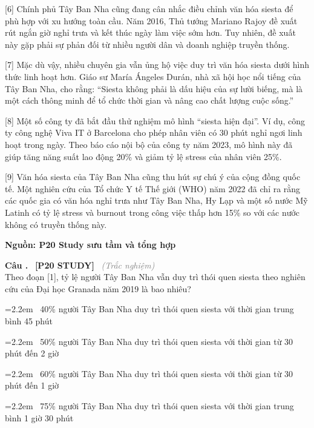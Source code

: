 \documentclass[12pt,a4paper,twoside]{article}
\newcounter{qcounter}
\newcommand{\question}[2][]{%
    \stepcounter{qcounter}%
    \par\vspace{5pt}%
    \noindent\textcolor{primaryBlue}{\textbf{Câu \theqcounter.}}~%
    \textcolor{secondaryBlue}{\small\textbf{[P20 STUDY]}}~%
    \if\relax\detokenize{#1}\relax\else\textcolor{gray}{\small\textit{(#1)}}~\fi\\[1pt]
    \noindent #2%
}
\newcommand{\choiceitem}[2]{%
    \tikz[baseline=-0.5ex]{
        \node[draw=primaryBlue, circle, minimum size=1.5em, inner sep=0pt, thick] {\textbf{#1}};
    }~#2%
}
\newenvironment{readingpassage}[1][]{%
    \begin{tcolorbox}[enhanced, colback=grayLight, colframe=secondaryBlue,
        coltitle=textDark, fonttitle=\bfseries, title={#1},
        rounded corners, arc=3mm, boxrule=1pt,
        left=15pt, right=15pt, top=10pt, bottom=10pt,
        breakable, before skip=10pt, after skip=10pt, drop fuzzy shadow]
    \setstretch{1.3}
}{\end{tcolorbox}}
\begin{document}
\begin{readingpassage}[]
[6] Chính phủ Tây Ban Nha cũng đang cân nhắc điều chỉnh văn hóa siesta để phù hợp với xu hướng toàn cầu. Năm 2016, Thủ tướng Mariano Rajoy đề xuất rút ngắn giờ nghỉ trưa và kết thúc ngày làm việc sớm hơn. Tuy nhiên, đề xuất này gặp phải sự phản đối từ nhiều người dân và doanh nghiệp truyền thống.

[7] Mặc dù vậy, nhiều chuyên gia vẫn ủng hộ việc duy trì văn hóa siesta dưới hình thức linh hoạt hơn. Giáo sư María Ángeles Durán, nhà xã hội học nổi tiếng của Tây Ban Nha, cho rằng: ``Siesta không phải là dấu hiệu của sự lười biếng, mà là một cách thông minh để tổ chức thời gian và nâng cao chất lượng cuộc sống.''

[8] Một số công ty đã bắt đầu thử nghiệm mô hình ``siesta hiện đại''. Ví dụ, công ty công nghệ Viva IT ở Barcelona cho phép nhân viên có 30 phút nghỉ ngơi linh hoạt trong ngày. Theo báo cáo nội bộ của công ty năm 2023, mô hình này đã giúp tăng năng suất lao động 20\% và giảm tỷ lệ stress của nhân viên 25\%.

[9] Văn hóa siesta của Tây Ban Nha cũng thu hút sự chú ý của cộng đồng quốc tế. Một nghiên cứu của Tổ chức Y tế Thế giới (WHO) năm 2022 đã chỉ ra rằng các quốc gia có văn hóa nghỉ trưa như Tây Ban Nha, Hy Lạp và một số nước Mỹ Latinh có tỷ lệ stress và burnout trong công việc thấp hơn 15\% so với các nước không có truyền thống này.

\hfill \textbf{Nguồn: P20 Study sưu tầm và tổng hợp}
\end{readingpassage}

\setcounter{qcounter}{0}
\question[Trắc nghiệm]{Theo đoạn [1], tỷ lệ người Tây Ban Nha vẫn duy trì thói quen siesta theo nghiên cứu của Đại học Granada năm 2019 là bao nhiêu?}
\par\vspace{4pt}
\noindent\hangindent=2.2em\choiceitem{A}{40\% người Tây Ban Nha duy trì thói quen siesta với thời gian trung bình 45 phút}\par\vspace{4pt}
\noindent\hangindent=2.2em\choiceitem{B}{50\% người Tây Ban Nha duy trì thói quen siesta với thời gian từ 30 phút đến 2 giờ}\par\vspace{4pt}
\noindent\hangindent=2.2em\choiceitem{C}{60\% người Tây Ban Nha duy trì thói quen siesta với thời gian từ 30 phút đến 1 giờ}\par\vspace{4pt}
\noindent\hangindent=2.2em\choiceitem{D}{75\% người Tây Ban Nha duy trì thói quen siesta với thời gian trung bình 1 giờ 30 phút}\par\vspace{4pt}
\end{document}
